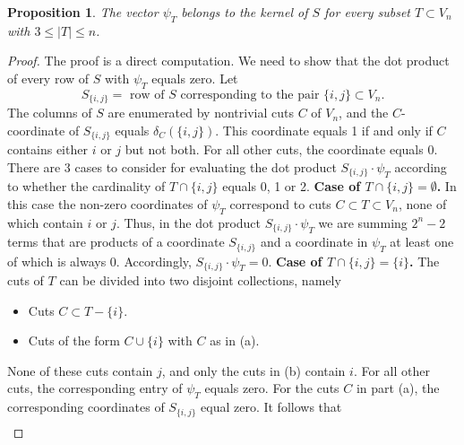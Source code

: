 \documentclass[12pt]{amsart}
\numberwithin{theorem}{section}
\newtheorem{proposition}[theorem]{Proposition}
\theoremstyle{remark}
\begin{document}
\begin{proposition} \label{Proof of alternating sums lying in the kernel}
The vector $\psi_T$ belongs to the kernel of $S$ for every subset $T\subset V_n$ with $3\le |T|\le n$. 
\end{proposition}
\begin{proof}
The proof is a direct computation. We need to show that the dot product of every row of $S$ with $\psi_T$ equals zero. Let 
$$S_{\{i,j\}} = \text{ row of $S$ corresponding to the pair }\{i,j\}\subset V_n.$$
The columns of $S$ are enumerated by nontrivial cuts $C$ of $V_n$, and the $C$-coordinate of $S_{\{i,j\}}$ equals $\delta_C(\{i,j\})$. This coordinate equals 1 if and only if $C$ contains either $i$ or $j$ but not both. For all other cuts, the coordinate equals 0. There are 3 cases to consider for evaluating the dot product $S_{\{i,j\}}\cdot \psi_T$ according to whether the cardinality of $T\cap \{i,j\}$ equals 0, 1 or 2. 
\vskip3mm
{\bf Case of $T\cap \{i,j\} = \emptyset$.} In this case the non-zero coordinates of $\psi_T$ correspond to cuts $C\subset T\subset V_n$, none of which contain $i$ or $j$. Thus, in the dot product $S_{\{i,j\}} \cdot \psi_T$ we are summing $2^n-2$ terms that are products of a coordinate $S_{\{i,j\}}$ and a coordinate in $\psi_T$ at least one of which is always 0. Accordingly, $S_{\{i,j\}} \cdot \psi_T=0$.
\vskip3mm
{\bf Case of $T\cap \{i,j\} = \{i\}$.} The cuts of $T$ can be divided into two disjoint collections, namely 
\begin{itemize}
	\item[(a)] Cuts $C\subset T-\{i\}$. 
	\item[(b)] Cuts of the form $C\cup \{i\}$ with $C$ as in (a). 
\end{itemize}
None of these cuts contain $j$, and only the cuts in (b) contain $i$. For all other cuts, the corresponding entry of $\psi_T$ equals zero. For the cuts $C$ in part (a), the corresponding coordinates of $S_{\{i,j\}}$ equal zero. It follows that
\begin{align*}

\end{align*}
\end{proof}
\end{document}
